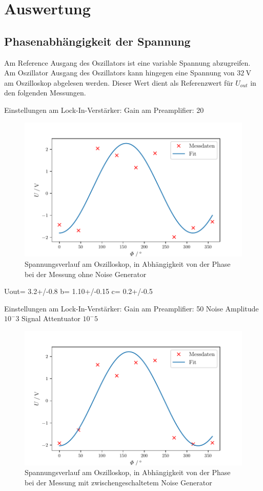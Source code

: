 \section{Auswertung}
\label{sec:Auswertung}

\subsection{Phasenabhängigkeit der Spannung} %
\label{sub:Phasenabhängigkeit der Spannung}


Am Reference Ausgang des Oszillators ist eine variable Spannung abzugreifen. Am Oszillator Ausgang des Oszillators kann hingegen eine Spannung von $\qty{32}{\volt}$
am Oszilloskop abgelesen werden.
Dieser Wert dient als Referenzwert für $U_{out}$ in den folgenden Messungen.


Einstellungen am Lock-In-Verstärker: Gain am Preamplifier: 20
\begin{figure}
  \centering
  \includegraphics{build/plot1.pdf}
  \caption{Spannungsverlauf am Oszilloskop, in Abhängigkeit von der Phase bei der Messung ohne Noise Generator}
  \label{fig:plot1}
\end{figure}
Uout= 3.2+/-0.8
b= 1.10+/-0.15
c= 0.2+/-0.5


Einstellungen am Lock-In-Verstärker: Gain am Preamplifier: 50
Noise Amplitude $10^-3$
Signal Attentuator $10^-5$

\begin{figure}
  \centering
  \includegraphics{build/plot2.pdf}
  \caption{Spannungsverlauf am Oszilloskop, in Abhängigkeit von der Phase bei der Messung mit zwischengeschaltetem Noise Generator}
  \label{fig:plot2}
\end{figure}

